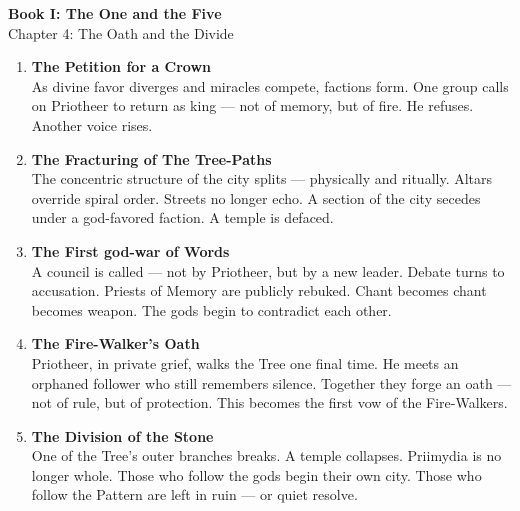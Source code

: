 \documentclass[10pt]{article}
\begin{document}
\begin{center}
    \Large\textbf{Book I: The One and the Five} \\
    \large Chapter 4: The Oath and the Divide \\
\end{center}

\vspace{1in}


\begin{center}
\begin{enumerate}
    \item \textbf{The Petition for a Crown} \\
    As divine favor diverges and miracles compete, factions form. One group calls on Priotheer to return as king — not of memory, but of fire. He refuses. Another voice rises.

    \vspace{1in}
    \item \textbf{The Fracturing of The Tree-Paths} \\
       The concentric structure of the city splits — physically and ritually. Altars override spiral order. Streets no longer echo. A section of the city secedes under a god-favored faction. A temple is defaced.
    \vspace{1in}
    \item \textbf{The First god-war of Words} \\
      A council is called — not by Priotheer, but by a new leader. Debate turns to accusation. Priests of Memory are publicly rebuked. Chant becomes chant becomes weapon. The gods begin to contradict each other.
    \vspace{1in}
    \item \textbf{The Fire-Walker's Oath} \\
    Priotheer, in private grief, walks the Tree one final time. He meets an orphaned follower who still remembers silence. Together they forge an oath — not of rule, but of protection. This becomes the first vow of the Fire-Walkers.

    \vspace{1in}
    \item \textbf{The Division of the Stone} \\
    One of the Tree’s outer branches breaks. A temple collapses. Priimydia is no longer whole. Those who follow the gods begin their own city. Those who follow the Pattern are left in ruin — or quiet resolve.

\end{enumerate}
\end{center}
\end{document}
